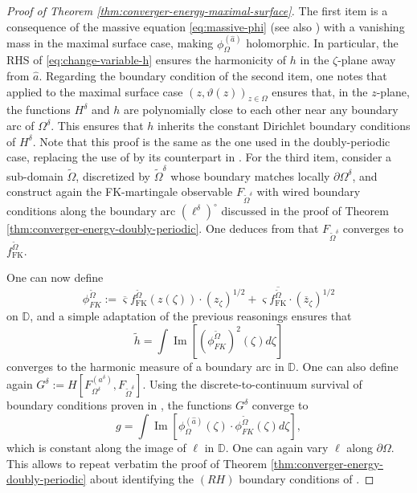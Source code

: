 \documentclass[reqno]{amsart}
\numberwithin{equation}{section}
\theoremstyle{definition}
\theoremstyle{remark}
\renewcommand\Im{\operatorname{Im}}
\begin{document}
\begin{proof}[Proof of Theorem \ref{thm:converger-energy-maximal-surface}]
The first item is a consequence of the massive equation \eqref{eq:massive-phi} (see also \cite[Proposition~2.21]{CLR2}) with a vanishing mass in the maximal surface case, making $\phi^{(\hat{a})}_\Omega$ holomorphic.
 In particular, the RHS of \eqref{eq:change-variable-h} ensures the harmonicity of $h$ in the $\zeta$-plane away from $\hat{a} $. Regarding the boundary condition of the second item, one notes that  \cite[Proof of Proposition 2.2]{Par25} applied to the maximal surface case $(z,\vartheta(z))_{z\in \Omega}$ ensures that, in the $z$-plane, the functions $H^\delta$ and $h$ are polynomially close to each other near any boundary arc of $\Omega^\delta$. This ensures that $h$ inherits the constant Dirichlet boundary conditions of $H^\delta$. 
 Note that this proof is the same as the one used in the doubly-periodic case, replacing the use of \cite[Theorem~4.1]{Che20} by its counterpart in \cite{Par25}. 
 For the third item, consider a sub-domain $\widetilde{\Omega}$, discretized by $\widetilde{\Omega}^\delta$ whose boundary matches locally $\partial \Omega^\delta$, and construct again the FK-martingale observable $F_{\widetilde{\Omega}^\delta}$ with wired boundary conditions along the boundary arc $(\ell^\delta)^\circ$ discussed in the proof of Theorem \ref{thm:converger-energy-doubly-periodic}. 
 One deduces from \cite[Theorem 1.2]{Par25} that $F_{\widetilde{\Omega}^\delta}$ converges to $f^{\widetilde{\Omega}}_{\mathrm{FK}}$. 
 
 One can now define 
 \begin{equation*}
 	\phi_{FK}^{\widetilde\Omega}:= \overline{\varsigma} f^{\widetilde{\Omega}}_{\mathrm{FK}}(z(\zeta)) \cdot (z_\zeta)^{1/2} + \varsigma \overline{f^{\widetilde{\Omega}}_{\mathrm{FK}}} \cdot (\overline{z}_\zeta)^{1/2}
 \end{equation*}
 on $\mathbb{D}$, and a simple adaptation of the previous reasonings ensures that
 \begin{equation*}
 	\tilde{h}= \int\Im[(\phi_{FK}^{\widetilde\Omega})^2(\zeta)d\zeta]
 \end{equation*}
converges to the harmonic measure of a boundary arc in $\mathbb{D}$. One can also define again $G^\delta := H[F^{(a^\delta)}_{\Omega^\delta}, F_{\widetilde{\Omega}^\delta}]$. Using the discrete-to-continuum survival of boundary conditions proven in \cite{Par25}, the functions $G^\delta$ converge to 
 \begin{equation*}
 	g=\int \Im [\phi^{(\hat{a})}_\Omega(\zeta) \cdot  \phi_{FK}^{\widetilde\Omega}(\zeta) d\zeta],
 \end{equation*}
 which is constant along the image of $\ell$ in $ \mathbb{D}$. One can again vary $\ell$ along $\partial \Omega$. This allows to repeat verbatim the proof of Theorem \ref{thm:converger-energy-doubly-periodic} about identifying the $(RH)$ boundary conditions of \cite[Section 6.4]{park2025near}.


\end{proof}
\end{document}
